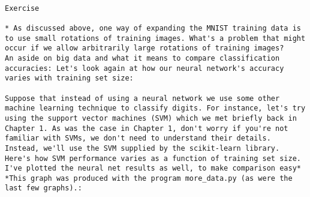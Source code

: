 \begin{lstlisting}

Exercise

* As discussed above, one way of expanding the MNIST training data is to use small rotations of training images. What's a problem that might occur if we allow arbitrarily large rotations of training images? 
An aside on big data and what it means to compare classification accuracies: Let's look again at how our neural network's accuracy varies with training set size:

Suppose that instead of using a neural network we use some other machine learning technique to classify digits. For instance, let's try using the support vector machines (SVM) which we met briefly back in Chapter 1. As was the case in Chapter 1, don't worry if you're not familiar with SVMs, we don't need to understand their details. Instead, we'll use the SVM supplied by the scikit-learn library. Here's how SVM performance varies as a function of training set size. I've plotted the neural net results as well, to make comparison easy* *This graph was produced with the program more_data.py (as were the last few graphs).:


\end{lstlisting}
